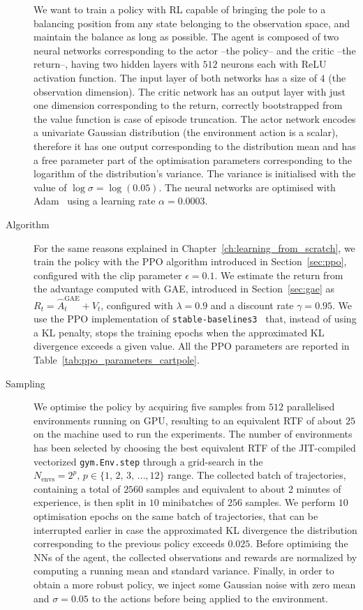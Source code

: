 \begin{description}
We want to train a policy with \ac{RL} capable of bringing the pole to a balancing position from any state belonging to the observation space, and maintain the balance as long as possible.
The agent is composed of two neural networks corresponding to the actor --the policy-- and the critic --the return--, having two hidden layers with $512$ neurons each with {\small ReLU} activation function.
The input layer of both networks has a size of $4$ (the observation dimension).
The critic network has an output layer with just one dimension corresponding to the return, correctly bootstrapped from the value function is case of episode truncation.
The actor network encodes a univariate Gaussian distribution (the environment action is a scalar), therefore it has one output corresponding to the distribution mean and has a free parameter part of the optimisation parameters corresponding to the logarithm of the distribution's variance.
The variance is initialised with the value of $\log \sigma = \log(0.05)$.
The neural networks are optimised with Adam~\parencite{kingma_adam_2017} using a learning rate $\alpha = 0.0003$.
%
\item[Algorithm]
For the same reasons explained in Chapter~\ref{ch:learning_from_scratch}, we train the policy with the \ac{PPO} algorithm introduced in Section~\ref{sec:ppo}, configured with the clip parameter $\epsilon=0.1$.
We estimate the return from the advantage computed with \ac{GAE}, introduced in Section~\ref{sec:gae} as $R_t = \hat{A}^\text{GAE}_t + V_t$, configured with $\lambda=0.9$ and a discount rate $\gamma = 0.95$.
We use the \ac{PPO} implementation of \texttt{stable-baselines3}~\parencite{raffin_stable-baselines3_2021} that, instead of using a \ac{KL} penalty, stops the training epochs when the approximated \ac{KL} divergence exceeds a given value.
All the \ac{PPO} parameters are reported in Table~\ref{tab:ppo_parameters_cartpole}.
%
\item[Sampling]
We optimise the policy by acquiring five samples from $512$ parallelised environments running on \ac{GPU}, resulting to an equivalent \ac{RTF} of about $25$ on the machine used to run the experiments.
The number of environments has been selected by choosing the best equivalent \ac{RTF} of the \ac{JIT}-compiled vectorized \texttt{gym.Env.step} through a grid-search in the $N_\text{envs} = 2^p,\, p \in \{1,\, 2,\, 3,\, \dots, 12\}$ range.
The collected batch of trajectories, containing a total of $2560$ samples and equivalent to about 2 minutes of experience, is then split in $10$ minibatches of $256$ samples.
We perform $10$ optimisation epochs on the same batch of trajectories, that can be interrupted earlier in case the approximated \ac{KL} divergence \wrt the distribution corresponding to the previous policy exceeds $0.025$.
Before optimising the \acp{NN} of the agent, the collected observations and rewards are normalized by computing a running mean and standard variance.
Finally, in order to obtain a more robust policy, we inject some Gaussian noise with zero mean and $\sigma=0.05$ to the actions before being applied to the environment.
%
\end{description}

